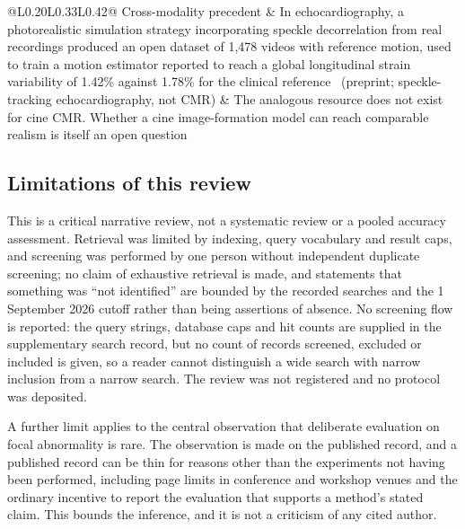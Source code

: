 \begin{longtable}{@{}L{0.20\textwidth}L{0.33\textwidth}L{0.42\textwidth}@{}}
Cross-modality precedent & In echocardiography, a photorealistic simulation strategy incorporating speckle decorrelation from real recordings produced an open dataset of 1,478 videos with reference motion, used to train a motion estimator reported to reach a global longitudinal strain variability of 1.42\% against 1.78\% for the clinical reference~\citep{judge2026} (preprint; speckle-tracking echocardiography, not CMR) & The analogous resource does not exist for cine CMR. Whether a cine image-formation model can reach comparable realism is itself an open question\\
\bottomrule
\end{longtable}

\subsection{Limitations of this review}\label{sec:limitations}

This is a critical narrative review, not a systematic review or a pooled accuracy assessment.
Retrieval was limited by indexing, query vocabulary and result caps, and screening was performed by
one person without independent duplicate screening; no claim of exhaustive retrieval is made, and
statements that something was \enquote{not identified} are bounded by the recorded searches and the
1 September 2026 cutoff rather than being assertions of absence. No screening flow is reported: the
query strings, database caps and hit counts are supplied in the supplementary search record, but no
count of records screened, excluded or included is given, so a reader cannot distinguish a wide
search with narrow inclusion from a narrow search. The review was not registered and no protocol was
deposited.

A further limit applies to the central observation that deliberate evaluation on focal
abnormality is rare. The observation is made on the published record, and a published record can be
thin for reasons other than the experiments not having been performed, including page limits in
conference and workshop venues and the ordinary incentive to report the evaluation that supports a
method's stated claim. This bounds the inference, and it is not a criticism of any cited author.

